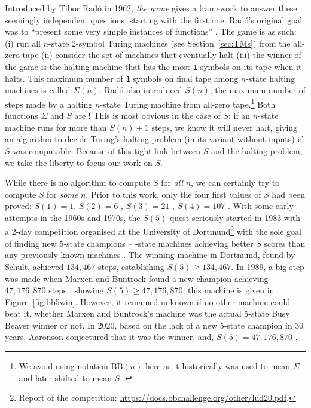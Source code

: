 \documentclass[a4paper,british]{article}
\theoremstyle{definition} %
\numberwithin{equation}{section}
\theoremstyle{definition} %
\newcommand{\sone}{\texttt{1}\xspace}
\newcommand{\BBtheFifth}{47{,}176{,}870}
\newcommand{\radofull}{Tibor Rad\'o\xspace}
\newcommand{\rado}{Rad\'o\xspace}
\begin{document}
Introduced by \radofull in 1962, \textit{the \BBfull game} gives a framework to answer these seemingly independent questions, starting with the first one: \rado's original goal was to ``present some very simple instances of \noncomput functions'' \cite{Rado_1962}. The game is as such: (i) run all $n$-state 2-symbol Turing machines (see Section~\ref{sec:TMs}) from the all-zero tape (ii) consider the set of machines that eventually halt (iii) the winner of the game is the halting machine that has the most \sone symbols on its tape when it halts. This maximum number of \sone symbols on final tape among $n$-state halting machines is called $\Sigma(n)$. \rado also introduced $S(n)$, the maximum number of steps made by a halting $n$-state Turing machine from all-zero tape.\footnote{We avoid using notation $\text{BB}(n)$ here as it historically was used to mean $\Sigma$ \cite{Rado_1962, 10.5555/1151785.1151794} and later shifted to mean $S$ \cite{BusyBeaverFrontier,sterin_2022_14955828}.} Both functions $\Sigma$ and $S$ are \noncomput! This is most obvious in the case of $S$: if an $n$-state machine runs for more than $S(n)+1$ steps, we know it will never halt, giving an algorithm to decide Turing's halting problem (in its variant without inputs) if $S$ was computable. Because of this tight link between $S$ and the halting problem, we take the liberty to focus our work on $S$.

While there is no algorithm to compute $S$ for \textit{all} $n$, we can certainly try to compute $S$ for \textit{some} $n$. Prior to this work, only the four first values of $S$ had been proved: $S(1)=1$, $S(2)=6$ \cite{Rado_1962}, $S(3) = 21$ \cite{Lin1963}, $S(4) = 107$ \cite{Brady83}. With some early attempts in the 1960s and 1970s, the $S(5)$ quest seriously started in 1983 with a 2-day competition organised at the University of Dortmund\footnote{Report of the competition: \url{https://docs.bbchallenge.org/other/lud20.pdf}.} with the sole goal of finding new 5-state champions -- -state machines achieving better $S$ scores than any previously known machines \cite{PMichel_website,michel2019busy}. The winning machine in Dortmund, found by Schult, achieved $134{,}467$ steps, establishing $S(5) \geq 134{,}467$. In 1989, a big step was made when Marxen and Buntrock found a new champion achieving $\BBtheFifth$ steps \cite{Marxen_1990}, showing $S(5) \geq \BBtheFifth$; this machine is given in Figure~\ref{fig:bb5win}. However, it remained unknown if no other machine could beat it, \ie whether Marxen and Buntrock's machine was the actual 5-state Busy Beaver winner or not. In 2020, based on the lack of a new 5-state champion in 30 years, Aaronson conjectured that it was the winner, and, $S(5) = \BBtheFifth$ \cite{BusyBeaverFrontier}.
\end{document}
